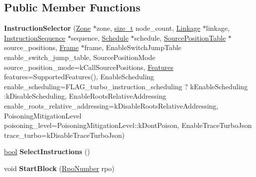 \subsection*{Public Member Functions}
\begin{DoxyCompactItemize}
\item 
\mbox{\label{classv8_1_1internal_1_1compiler_1_1InstructionSelector_aca545623e8f5cc424e9302ed25f04abb}} 
{\bfseries Instruction\+Selector} (\mbox{\hyperlink{classv8_1_1internal_1_1Zone}{Zone}} $\ast$zone, \mbox{\hyperlink{classsize__t}{size\+\_\+t}} node\+\_\+count, \mbox{\hyperlink{classv8_1_1internal_1_1compiler_1_1Linkage}{Linkage}} $\ast$linkage, \mbox{\hyperlink{classv8_1_1internal_1_1compiler_1_1InstructionSequence}{Instruction\+Sequence}} $\ast$sequence, \mbox{\hyperlink{classv8_1_1internal_1_1compiler_1_1Schedule}{Schedule}} $\ast$schedule, \mbox{\hyperlink{classv8_1_1internal_1_1compiler_1_1SourcePositionTable}{Source\+Position\+Table}} $\ast$source\+\_\+positions, \mbox{\hyperlink{classv8_1_1internal_1_1compiler_1_1Frame}{Frame}} $\ast$frame, Enable\+Switch\+Jump\+Table enable\+\_\+switch\+\_\+jump\+\_\+table, Source\+Position\+Mode source\+\_\+position\+\_\+mode=k\+Call\+Source\+Positions, \mbox{\hyperlink{classv8_1_1internal_1_1compiler_1_1InstructionSelector_1_1Features}{Features}} features=Supported\+Features(), Enable\+Scheduling enable\+\_\+scheduling=F\+L\+A\+G\+\_\+turbo\+\_\+instruction\+\_\+scheduling ? k\+Enable\+Scheduling \+:k\+Disable\+Scheduling, Enable\+Roots\+Relative\+Addressing enable\+\_\+roots\+\_\+relative\+\_\+addressing=k\+Disable\+Roots\+Relative\+Addressing, Poisoning\+Mitigation\+Level poisoning\+\_\+level=Poisoning\+Mitigation\+Level\+::k\+Dont\+Poison, Enable\+Trace\+Turbo\+Json trace\+\_\+turbo=k\+Disable\+Trace\+Turbo\+Json)
\item 
\mbox{\label{classv8_1_1internal_1_1compiler_1_1InstructionSelector_a8eaa890e281c9feb581491da1e373eae}} 
\mbox{\hyperlink{classbool}{bool}} {\bfseries Select\+Instructions} ()
\item 
\mbox{\label{classv8_1_1internal_1_1compiler_1_1InstructionSelector_ada7a5433d9707b2ff3be4aee76a9fe59}} 
void {\bfseries Start\+Block} (\mbox{\hyperlink{classv8_1_1internal_1_1compiler_1_1RpoNumber}{Rpo\+Number}} rpo)
\item 

\end{DoxyCompactItemize}
